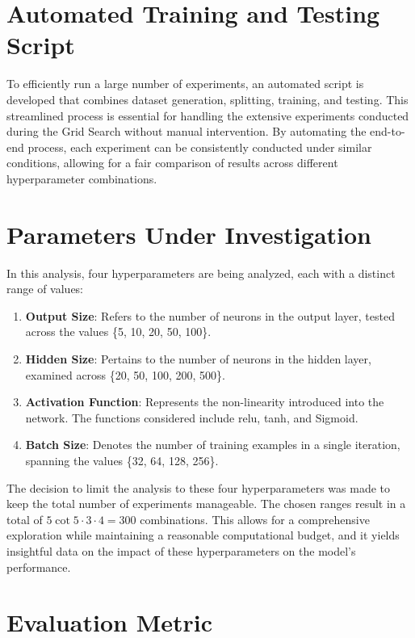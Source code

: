 \section{Automated Training and Testing Script}

To efficiently run a large number of experiments, an automated script is developed that combines dataset generation, splitting, training, and testing. This streamlined process is essential for handling the extensive experiments conducted during the Grid Search without manual intervention. By automating the end-to-end process, each experiment can be consistently conducted under similar conditions, allowing for a fair comparison of results across different hyperparameter combinations.


\section{Parameters Under Investigation}

In this analysis, four hyperparameters are being analyzed, each with a distinct range of values:

\begin{enumerate}
    \item \textbf{Output Size}: Refers to the number of neurons in the output layer, tested across the values \{5, 10, 20, 50, 100\}.
    \item \textbf{Hidden Size}: Pertains to the number of neurons in the hidden layer, examined across \{20, 50, 100, 200, 500\}.
    \item \textbf{Activation Function}: Represents the non-linearity introduced into the network. The functions considered include \ac{relu}, \ac{tanh}, and Sigmoid.
    \item \textbf{Batch Size}: Denotes the number of training examples in a single iteration, spanning the values \{32, 64, 128, 256\}.
\end{enumerate}

The decision to limit the analysis to these four hyperparameters was made to keep the total number of experiments manageable. The chosen ranges result in a total of $5 \cot 5 \cdot 3 \cdot 4 = 300$ combinations. This allows for a comprehensive exploration while maintaining a reasonable computational budget, and it yields insightful data on the impact of these hyperparameters on the model's performance.


\section{Evaluation Metric}

